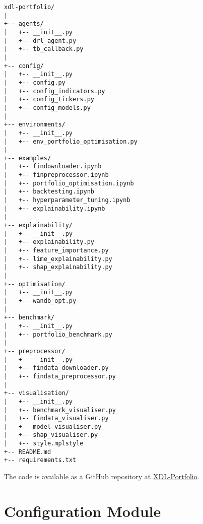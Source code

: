\begin{verbatim}
xdl-portfolio/
|
+-- agents/
|   +-- __init__.py
|   +-- drl_agent.py
|   +-- tb_callback.py
|
+-- config/
|   +-- __init__.py
|   +-- config.py
|   +-- config_indicators.py
|   +-- config_tickers.py
|   +-- config_models.py
|
+-- environments/
|   +-- __init__.py
|   +-- env_portfolio_optimisation.py
|
+-- examples/
|   +-- findownloader.ipynb
|   +-- finpreprocessor.ipynb
|   +-- portfolio_optimisation.ipynb
|   +-- backtesting.ipynb
|   +-- hyperparameter_tuning.ipynb
|   +-- explainability.ipynb
|
+-- explainability/
|   +-- __init__.py
|   +-- explainability.py
|   +-- feature_importance.py
|   +-- lime_explainability.py
|   +-- shap_explainability.py
|
+-- optimisation/
|   +-- __init__.py
|   +-- wandb_opt.py
|
+-- benchmark/
|   +-- __init__.py
|   +-- portfolio_benchmark.py
|
+-- preprocessor/
|   +-- __init__.py
|   +-- findata_downloader.py
|   +-- findata_preprocessor.py
|
+-- visualisation/
|   +-- __init__.py
|   +-- benchmark_visualiser.py
|   +-- findata_visualiser.py
|   +-- model_visualiser.py
|   +-- shap_visualiser.py
|   +-- style.mplstyle
+-- README.md
+-- requirements.txt
\end{verbatim}

The code is available as a GitHub repository at \href{https://github.com/ingridpi/xdl-portfolio.git}{XDL-Portfolio}.

\section{Configuration Module}

\inputminted[fontsize=\footnotesize,linenos,breaklines=true,breakanywhere=true,frame=lines,baselinestretch=1]{python}{../config/config.py}

\inputminted[fontsize=\footnotesize,linenos,breaklines=true,breakanywhere=true,frame=lines,baselinestretch=1]{python}{../config/config_tickers.py}

\inputminted[fontsize=\footnotesize,linenos,breaklines=true,breakanywhere=true,frame=lines,baselinestretch=1]{python}{../config/config_indicators.py}

\inputminted[fontsize=\footnotesize,linenos,breaklines=true,breakanywhere=true,frame=lines,baselinestretch=1]{python}{../config/config_models.py}

